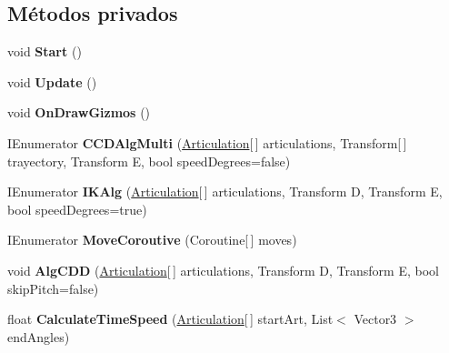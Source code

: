 \subsection*{Métodos privados}
\begin{DoxyCompactItemize}
\item 
\mbox{\label{class_i_k_a05da0dc2c3eceb11d7ba35f85fddcc96}} 
void {\bfseries Start} ()
\item 
\mbox{\label{class_i_k_aa8b06629bd9e65d3bb9c54bd62342627}} 
void {\bfseries Update} ()
\item 
\mbox{\label{class_i_k_afeaf9f9885b691b88c424c0b67d18608}} 
void {\bfseries On\+Draw\+Gizmos} ()
\item 
\mbox{\label{class_i_k_a013718309a8051f89d0865803f2d54e6}} 
I\+Enumerator {\bfseries C\+C\+D\+Alg\+Multi} (\mbox{\hyperlink{class_articulation}{Articulation}}\mbox{[}$\,$\mbox{]} articulations, Transform\mbox{[}$\,$\mbox{]} trayectory, Transform E, bool speed\+Degrees=false)
\item 
\mbox{\label{class_i_k_ad35cf24eca8cdf6e91e9b7d0c7c4337a}} 
I\+Enumerator {\bfseries I\+K\+Alg} (\mbox{\hyperlink{class_articulation}{Articulation}}\mbox{[}$\,$\mbox{]} articulations, Transform D, Transform E, bool speed\+Degrees=true)
\item 
\mbox{\label{class_i_k_afc0847eff1049646f1c299debeccde27}} 
I\+Enumerator {\bfseries Move\+Coroutive} (Coroutine\mbox{[}$\,$\mbox{]} moves)
\item 
\mbox{\label{class_i_k_a40cdb9bf2fd32e436a1a6f012915f9d8}} 
void {\bfseries Alg\+C\+DD} (\mbox{\hyperlink{class_articulation}{Articulation}}\mbox{[}$\,$\mbox{]} articulations, Transform D, Transform E, bool skip\+Pitch=false)
\item 
\mbox{\label{class_i_k_ad01a8072ea1add2840e26847b21bb7ff}} 
float {\bfseries Calculate\+Time\+Speed} (\mbox{\hyperlink{class_articulation}{Articulation}}\mbox{[}$\,$\mbox{]} start\+Art, List$<$ Vector3 $>$ end\+Angles)
\item 
\mbox{\label{class_i_k_ab99eedabf9fd4e61a273142356272e0f}} 

\end{DoxyCompactItemize}
